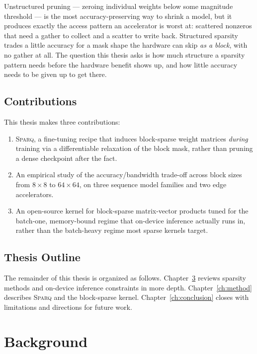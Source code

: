 \documentclass[11pt,twoside]{book}
\newcommand{\model}{\textsc{Sparq}\xspace}
\begin{document}
Unstructured pruning --- zeroing individual weights below some magnitude
threshold --- is the most accuracy-preserving way to shrink a model, but
it produces exactly the access pattern an accelerator is worst at:
scattered nonzeros that need a gather to collect and a scatter to write
back. Structured sparsity trades a little accuracy for a mask shape the
hardware can skip \emph{as a block}, with no gather at all. The
question this thesis asks is how much structure a sparsity pattern needs
before the hardware benefit shows up, and how little accuracy needs to
be given up to get there.

\section{Contributions}
\label{sec:contributions}

This thesis makes three contributions:

\begin{enumerate}
  \item \model, a fine-tuning recipe that induces block-sparse weight
    matrices \emph{during} training via a differentiable relaxation of
    the block mask, rather than pruning a dense checkpoint after the
    fact.
  \item An empirical study of the accuracy/bandwidth trade-off across
    block sizes from \(8\times 8\) to \(64\times 64\), on three sequence
    model families and two edge accelerators.
  \item An open-source kernel for block-sparse matrix-vector products
    tuned for the batch-one, memory-bound regime that on-device
    inference actually runs in, rather than the batch-heavy regime most
    sparse kernels target.
\end{enumerate}

\section{Thesis Outline}
\label{sec:outline}

The remainder of this thesis is organized as follows. Chapter~\ref{ch:background}
reviews sparsity methods and on-device inference constraints in more
depth. Chapter~\ref{ch:method} describes \model{} and the block-sparse
kernel. Chapter~\ref{ch:conclusion} closes with limitations and
directions for future work.

\chapter{Background}
\label{ch:background}
\end{document}
